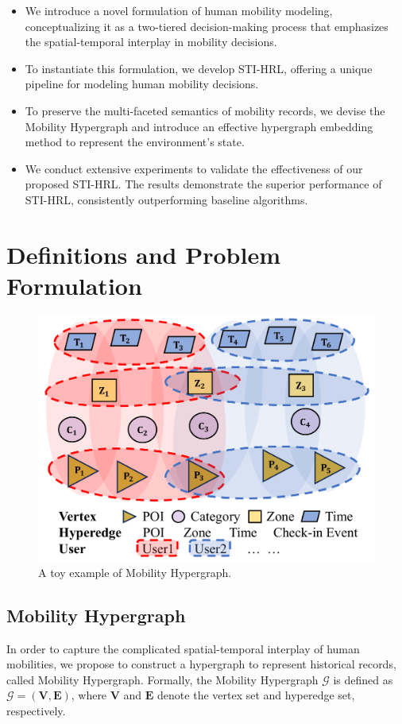 \documentclass[letterpaper]{article} %
\begin{document}
\begin{itemize}
\item We introduce a novel formulation of human mobility modeling, conceptualizing it as a two-tiered decision-making process that emphasizes the spatial-temporal interplay in mobility decisions.
\item To instantiate this formulation, we develop STI-HRL, offering a unique pipeline for modeling human mobility decisions.
\item To preserve the multi-faceted semantics of mobility records, we devise the Mobility Hypergraph and introduce an effective hypergraph embedding method to represent the environment's state.
\item We conduct extensive experiments to validate the effectiveness of our proposed STI-HRL. The results demonstrate the superior performance of STI-HRL, consistently outperforming baseline algorithms.
\end{itemize}


\section{Definitions and Problem Formulation}

\begin{figure}[!t]
\centering
\includegraphics[width=\linewidth]{hypergraph.pdf}
\caption{A toy example of Mobility Hypergraph.}
\label{fig:mobility hypergraph}
\end{figure}
\subsection{Mobility Hypergraph}
In order to capture the complicated spatial-temporal interplay of human mobilities, we propose to construct a hypergraph to represent historical records, called Mobility Hypergraph. 
Formally, the Mobility Hypergraph $\mathcal{G}$ is defined as $\mathcal{G} = (\mathbf{V}, \mathbf{E})$, where $\mathbf{V}$ and $\mathbf{E}$ denote the vertex set and hyperedge set, respectively. 
\end{document}

